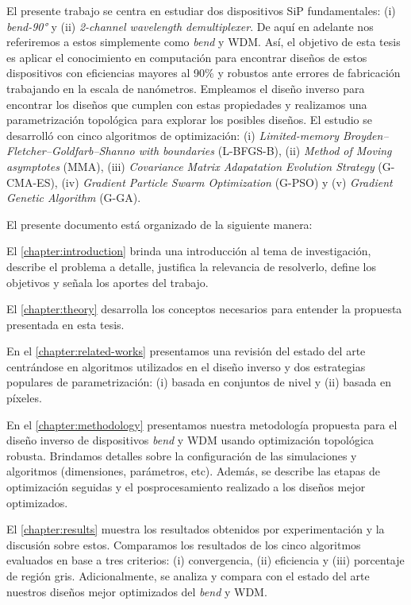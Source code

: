 El presente trabajo se centra en estudiar dos dispositivos SiP
fundamentales:
(i) \emph{bend-90°} y (ii) \emph{2-channel wavelength demultiplexer}.
De aquí en adelante nos referiremos a estos simplemente como \emph{bend} y WDM.
Así, el objetivo de esta tesis es aplicar el conocimiento en computación para
encontrar diseños de estos dispositivos con eficiencias mayores al 90\%
y robustos ante errores de fabricación trabajando en la escala de nanómetros. 
Empleamos el diseño inverso para encontrar los diseños que cumplen con estas propiedades y
realizamos una parametrización topológica para explorar los posibles diseños.
El estudio se desarrolló con cinco algoritmos de optimización: (i) \emph{Limited-memory Broyden–Fletcher–Goldfarb–Shanno with boundaries} (L-BFGS-B), 
(ii) \emph{Method of Moving asymptotes} (MMA), 
(iii) \emph{Covariance Matrix Adapatation Evolution Strategy} (G-CMA-ES), (iv) \emph{Gradient Particle Swarm Optimization} (G-PSO) y (v) \emph{Gradient Genetic Algorithm} (G-GA).


El presente documento está organizado de la siguiente manera:

El \autoref{chapter:introduction}  brinda una introducción al tema de investigación, describe el problema a detalle, justifica la relevancia de resolverlo, define los objetivos y señala los aportes del trabajo.

El \autoref{chapter:theory} desarrolla los conceptos necesarios para entender la propuesta presentada
en esta tesis.

En el \autoref{chapter:related-works} presentamos una revisión del estado del arte centrándose
en algoritmos utilizados en el diseño inverso y dos estrategias populares de parametrización:
(i) basada en conjuntos de nivel y (ii) basada en píxeles.


En el \autoref{chapter:methodology} presentamos nuestra metodología propuesta para el diseño inverso de dispositivos \emph{bend} y WDM usando optimización topológica robusta. 
Brindamos detalles sobre la configuración
de las simulaciones y algoritmos (dimensiones, parámetros, etc).
Además, se describe las etapas de optimización seguidas y el posprocesamiento realizado a los diseños mejor optimizados.


El \autoref{chapter:results} muestra los resultados obtenidos por  experimentación y la discusión sobre estos.
Comparamos los resultados de los cinco algoritmos evaluados en base a tres criterios: 
(i) convergencia, (ii) eficiencia y (iii) porcentaje de región gris.
Adicionalmente, se analiza y compara con el estado del arte nuestros diseños mejor optimizados
del \emph{bend} y WDM.

